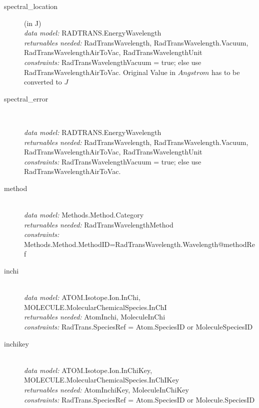 \documentclass[11pt,a4paper]{ivoa}
\begin{document}
\renewcommand{\descriptionlabel}[1]{\hspace{\labelsep}\texttt{#1}}
\begin{description}

\item [spectral\_location] (in J)\hfill\\
    \textit{data model:} RADTRANS.EnergyWavelength\\
	\textit{returnables needed:} RadTransWavelength, RadTransWavelength.Vacuum, 
RadTransWavelengthAirToVac, RadTransWavelengthUnit\\
	\textit{constraints:} RadTransWavelengthVacuum = true; else use 
RadTransWavelengthAirToVac. Original Value in $Angstrom$ has to be converted to $J$\\
	
\item [spectral\_error]  \hfill\\

    \textit{data model:} RADTRANS.EnergyWavelength\\
	\textit{returnables needed:} RadTransWavelength, RadTransWavelength.Vacuum, 
RadTransWavelengthAirToVac, RadTransWavelengthUnit\\
	\textit{constraints:} RadTransWavelengthVacuum = true; else use 
RadTransWavelengthAirToVac.\\
	
\item [method] \hfill\\
	\textit{data model:} Methods.Method.Category\\
	\textit{returnables needed:} RadTransWavelengthMethod\\
	\textit{constraints:} 
Methods.Method.MethodID=RadTransWavelength.Wavelength@methodRef\\

\item [inchi] \hfill\\
	\textit{data model:} ATOM.Isotope.Ion.InChi,  
MOLECULE.MolecularChemicalSpecies.InChI\\
        \textit{returnables needed:} AtomInchi, MoleculeInChi\\
	\textit{constraints:} RadTrans.SpeciesRef = Atom.SpeciesID or MoleculeSpeciesID
	
\item [inchikey] \hfill\\
	\textit{data model:} ATOM.Isotope.Ion.InChiKey, 
MOLECULE.MolecularChemicalSpecies.InChIKey \\
         \textit{returnables needed:} AtomInchiKey, MoleculeInChiKey\\
         \textit{constraints:} RadTrans.SpeciesRef = Atom.SpeciesID or  Molecule.SpeciesID


\end{description}
\end{document}
